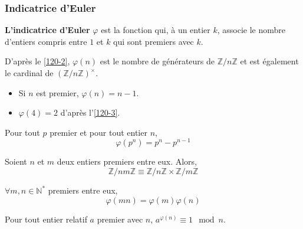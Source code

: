   \subsubsection{Indicatrice d'Euler}


  \begin{definition}
    \textbf{L'indicatrice d'Euler} $\varphi$ est la fonction qui, à un entier $k$, associe le nombre d'entiers compris entre $1$ et $k$ qui sont premiers avec $k$.
  \end{definition}

  \begin{remark}
    D'après le \cref{120-2}, $\varphi(n)$ est le nombre de générateurs de $\mathbb{Z}/n\mathbb{Z}$ et est également le cardinal de $(\mathbb{Z}/n\mathbb{Z})^\times$.
  \end{remark}

  \begin{example}
    \begin{itemize}
      \item Si $n$ est premier, $\varphi(n) = n-1$.
      \item $\varphi(4) = 2$ d'après l'\cref{120-3}.
    \end{itemize}
  \end{example}


  \begin{proposition}
    Pour tout $p$ premier et pour tout entier $n$,
    \[ \varphi(p^n) = p^n - p^{n-1} \]
  \end{proposition}


  \begin{theorem}
    \label{120-4}
    Soient $n$ et $m$ deux entiers premiers entre eux. Alors,
    \[ \mathbb{Z}/nm\mathbb{Z} \equiv \mathbb{Z}/n\mathbb{Z} \times \mathbb{Z}/m\mathbb{Z} \]
  \end{theorem}

  \begin{corollary}
    $\forall m, n \in \mathbb{N}^*$ premiers entre eux,
    \[ \varphi(mn) = \varphi(m)\varphi(n) \]
  \end{corollary}

  \begin{proposition}
    Pour tout entier relatif $a$ premier avec $n$, $a^{\varphi(n)} \equiv 1 \mod n$.
  \end{proposition}

